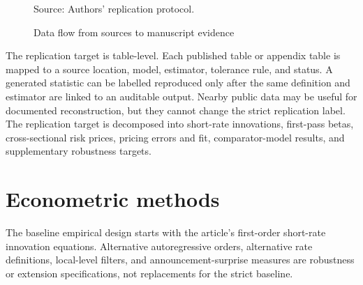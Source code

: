\documentclass[11pt]{article}
\begin{document}
\begin{figure}[htbp]
\centering
\small
{}
\caption{Data flow from sources to manuscript evidence}
\small Source: Authors' replication protocol.
\end{figure}

The replication target is table-level. Each published table or appendix table is
mapped to a source location, model, estimator, tolerance rule, and status. A
generated statistic can be labelled reproduced only after the same definition and
estimator are linked to an auditable output. Nearby public data may be useful for
documented reconstruction, but they cannot change the strict replication label.
The replication target is decomposed into short-rate innovations, first-pass
betas, cross-sectional risk prices, pricing errors and fit, comparator-model
results, and supplementary robustness targets. %

\section{Econometric methods}
\label{sec:methods}

The baseline empirical design starts with the article's first-order
short-rate innovation equations. Alternative autoregressive orders, alternative
rate definitions, local-level filters, and announcement-surprise measures are
robustness or extension specifications, not replacements for the strict baseline.
\end{document}
